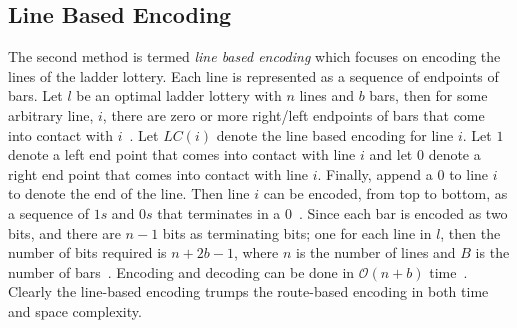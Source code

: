 \subsection{Line Based Encoding}
The second method is termed \emph{line based encoding} which focuses 
on encoding the lines of the ladder lottery. Each line is represented 
as a sequence of endpoints of bars. Let $l$ be an optimal ladder lottery 
with $n$ lines and $b$ bars, then for some arbitrary line, $i$, there 
are zero or more right/left endpoints of bars that 
come into contact with $i$~\cite{A5}. Let $LC(i)$ denote the line based encoding for line $i$.
Let $1$ denote a left end point that 
comes into contact with line $i$ and let $0$ denote a right 
end point that comes into contact with line $i$. Finally, append a $0$
to line $i$ to denote the end of the line. Then line $i$ can be 
encoded, from top to bottom, as a sequence of $1s$ and $0s$ that 
terminates in a $0$~\cite{A5}.  
Since each bar is encoded as two bits, and there are $n-1$ bits as terminating bits; 
one for each line in $l$, then the number of bits required is $n + 2b -1$, where $n$
is the number of lines and $B$ is the number of bars~\cite{A5}. Encoding and decoding can be 
done in $\mathcal{O}(n+b)$ time~\cite{A5}. Clearly the line-based encoding 
trumps the route-based encoding in both time and space complexity.

